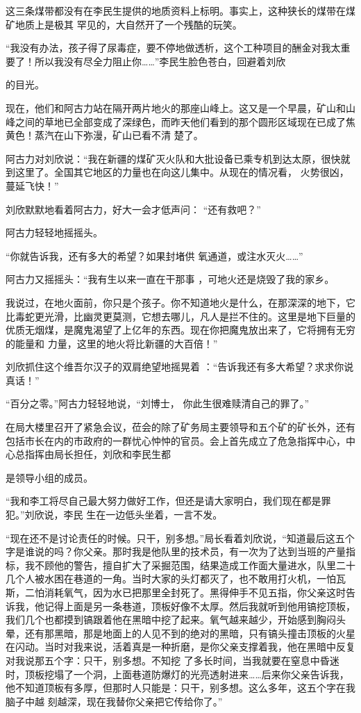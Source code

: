 \documentclass{article}
\begin{document}
这三条煤带都没有在李民生提供的地质资料上标明。事实上，这种狭长的煤带在煤矿地质上是极其
罕见的，大自然开了一个残酷的玩笑。 

“我没有办法，孩子得了尿毒症，要不停地做透析，这个工种项目的酬金对我太重要了！所以我没有尽全力阻止你……”李民生脸色苍白，回避着刘欣
\newpage

的目光。 

现在，他们和阿古力站在隔开两片地火的那座山峰上。这又是一个早晨，矿山和山峰之间的草地已全部变成了深绿色，而昨天他们看到的那个圆形区域现在已成了焦黄色！蒸汽在山下弥漫，矿山已看不清
楚了。 

阿古力对刘欣说：“我在新疆的煤矿灭火队和大批设备已乘专机到达太原，很快就到这里了。全国其它地区的力量也在向这儿集中。从现在的情况看，
火势很凶，蔓延飞快！” 

刘欣默默地看着阿古力，好大一会才低声问：
“还有救吧？” 


阿古力轻轻地摇摇头。 

“你就告诉我，还有多大的希望？如果封堵供
氧通道，或注水灭火……” 

\newpage

阿古力又摇摇头：“我有生以来一直在干那事
，可地火还是烧毁了我的家乡。 

我说过，在地火面前，你只是个孩子。你不知道地火是什么，在那深深的地下，它比毒蛇更光滑，比幽灵更莫测，它想去哪儿，凡人是拦不住的。这里是地下巨量的优质无烟煤，是魔鬼渴望了上亿年的东西。现在你把魔鬼放出来了，它将拥有无穷的能量和
力量，这里的地火将比新疆的大百倍！” 

刘欣抓住这个维吾尔汉子的双肩绝望地摇晃着
：“告诉我还有多大希望？求求你说真话！” 

“百分之零。”阿古力轻轻地说，“刘博士，
你此生很难赎清自己的罪了。” 


在局大楼里召开了紧急会议，莅会的除了矿务局主要领导和五个矿的矿长外，还有包括市长在内的市政府的一群忧心忡忡的官员。会上首先成立了危急指挥中心，中心总指挥由局长担任，刘欣和李民生都
\newpage

是领导小组的成员。 

“我和李工将尽自己最大努力做好工作，但还是请大家明白，我们现在都是罪犯。”刘欣说，李民
生在一边低头坐着，一言不发。 

“现在还不是讨论责任的时候。只干，别多想。”局长看着刘欣说，“知道最后这五个字是谁说的吗？你父亲。那时我是他队里的技术员，有一次为了达到当班的产量指标，我不顾他的警告，擅自扩大了采掘范围，结果造成工作面大量进水，队里二十几个人被水困在巷道的一角。当时大家的头灯都灭了，也不敢用打火机，一怕瓦斯，二怕消耗氧气，因为水已把那里全封死了。黑得伸手不见五指，你父亲这时告诉我，他记得上面是另一条巷道，顶板好像不太厚。然后我就听到他用镐挖顶板，我们几个也都摸到镐跟着他在黑暗中挖了起来。氧气越来越少，开始感到胸闷头晕，还有那黑暗，那是地面上的人见不到的绝对的黑暗，只有镐头撞击顶板的火星在闪动。当时对我来说，活着真是一种折磨，是你父亲支撑着我，他在黑暗中反复对我说那五个字：只干，别多想。不知挖
\newpage
了多长时间，当我就要在窒息中昏迷时，顶板挖塌了一个洞，上面巷道防爆灯的光亮透射进来……后来你父亲告诉我，他不知道顶板有多厚，但那时人只能是：只干，别多想。这么多年，这五个字在我脑子中越
刻越深，现在我替你父亲把它传给你了。” 
\end{document}
